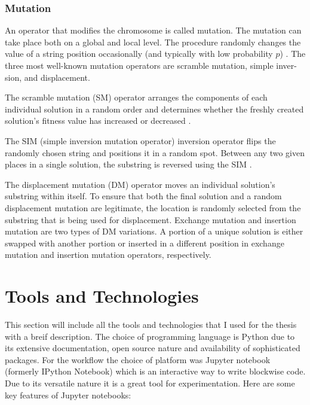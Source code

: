 \subsubsection{Mutation}
An operator that modifies the chromosome is called mutation. The mutation can take place both on a global and local level. The procedure randomly changes the value of a string position occasionally (and typically with low probability $p$) \citep{Tang1996}. The three most well-known mutation operators are scramble mutation, simple inver-sion, and displacement.\par

The scramble mutation (SM) operator arranges the components of each individual solution in a random order and determines whether the freshly created solution's fitness value has increased or decreased \citep{Jebari}.

The SIM (simple inversion mutation operator) inversion operator flips the randomly chosen string and positions it in a random spot. Between any two given places in a single solution, the substring is reversed using the SIM \citep{Jebari}. 

The displacement mutation (DM) operator moves an individual solution's substring within itself. To ensure that both the final solution and a random displacement mutation are legitimate, the location is randomly selected from the substring that is being used for displacement. Exchange mutation and insertion mutation are two types of DM variations. A portion of a unique solution is either swapped with another portion or inserted in a different position in exchange mutation and insertion mutation operators, respectively. \citep{Jebari}\par

\section{Tools and Technologies}

This section will include all the tools and technologies that I used for the thesis with a breif description. The choice of programming language is Python due to its extensive documentation, open source nature and availability of sophisticated packages. For the workflow the choice of platform was Jupyter notebook (formerly IPython Notebook) which is an interactive way to write blockwise code. Due to its versatile nature it is a great tool for experimentation. 
Here are some key features of Jupyter notebooks:

